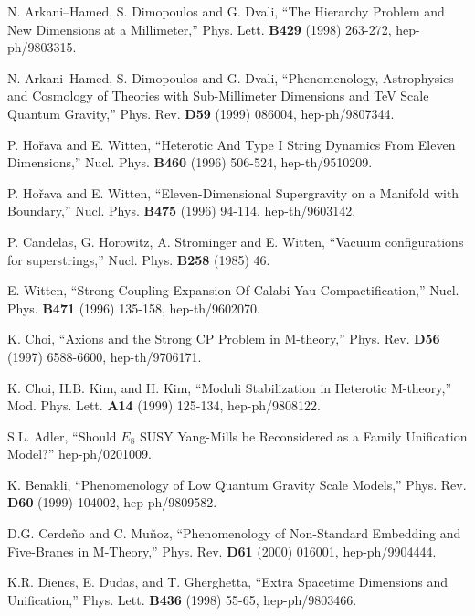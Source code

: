 \documentclass[a4paper,12pt,oneside]{article}
\begin{document}
\vspace{0.5cm}

\begin{thebibliography}{99}

N. Arkani--Hamed, S. Dimopoulos and G. Dvali, ``The Hierarchy 
Problem and New Dimensions at a Millimeter,'' Phys. Lett. 
\textbf{B429} (1998) 263-272, hep-ph/9803315.

N. Arkani--Hamed, S. Dimopoulos and G. Dvali, ``Phenomenology, 
Astrophysics and Cosmology of Theories with Sub-Millimeter 
Dimensions and TeV Scale Quantum Gravity,'' Phys. Rev. \textbf{D59} 
(1999) 086004, hep-ph/9807344.

P. Ho\v{r}ava and E. Witten, ``Heterotic And Type I String Dynamics 
From Eleven Dimensions,'' Nucl. Phys. \textbf{B460} (1996) 506-524, 
hep-th/9510209.

P. Ho\v{r}ava and E. Witten, ``Eleven-Dimensional Supergravity
on a Manifold with Boundary,'' Nucl. Phys. \textbf{B475} (1996) 
94-114, hep-th/9603142.

P. Candelas, G. Horowitz, A. Strominger and E. Witten, ``Vacuum 
configurations for superstrings,'' Nucl. Phys. \textbf{B258} (1985) 
46.

E. Witten, ``Strong Coupling Expansion Of Calabi-Yau 
Compactification,'' Nucl. Phys. \textbf{B471} (1996) 135-158, 
hep-th/9602070.

K. Choi, ``Axions and the Strong CP Problem in M-theory,'' Phys. Rev. \textbf{D56} (1997) 6588-6600, hep-th/9706171.

K. Choi, H.B. Kim, and H. Kim, ``Moduli Stabilization in Heterotic M-theory,'' Mod. Phys. Lett. \textbf{A14} (1999) 125-134, 
hep-ph/9808122.

S.L. Adler, ``Should $E_8$ SUSY Yang-Mills be Reconsidered
as a Family Unification Model?'' hep-ph/0201009.

K. Benakli, ``Phenomenology of Low Quantum Gravity Scale Models,'' Phys. Rev. \textbf{D60} (1999) 104002, hep-ph/9809582.

D.G. Cerde\~no and C. Mu\~noz, ``Phenomenology of Non-Standard Embedding and Five-Branes in M-Theory,'' Phys. Rev. \textbf{D61} 
(2000) 016001, hep-ph/9904444.

K.R. Dienes, E. Dudas, and T. Gherghetta, ``Extra Spacetime 
Dimensions and Unification,'' Phys. Lett. \textbf{B436} (1998) 
55-65, hep-ph/9803466.


\end{thebibliography}
\end{document}
